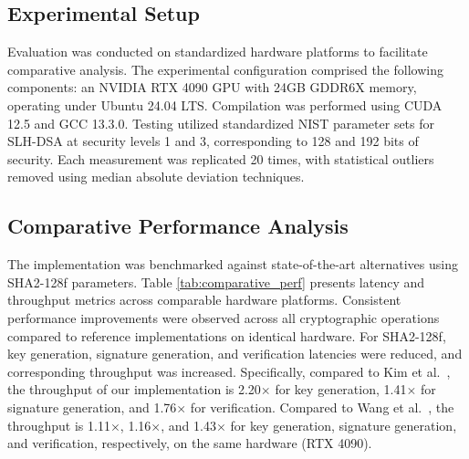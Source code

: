 \documentclass[journal]{IEEEtran}
\begin{document}
\subsection{Experimental Setup}

Evaluation was conducted on standardized hardware platforms to facilitate comparative analysis. The experimental configuration comprised the following components: an NVIDIA RTX 4090 GPU with 24GB GDDR6X memory, operating under Ubuntu 24.04 LTS. Compilation was performed using CUDA 12.5 and GCC 13.3.0.
Testing utilized standardized NIST parameter sets for SLH-DSA at security levels 1 and 3, corresponding to 128 and 192 bits of security. Each measurement was replicated 20 times, with statistical outliers removed using median absolute deviation techniques.

\subsection{Comparative Performance Analysis}

The implementation was benchmarked against state-of-the-art alternatives using SHA2-128f parameters. Table \ref{tab:comparative_perf} presents latency and throughput metrics across comparable hardware platforms.
Consistent performance improvements were observed across all cryptographic operations compared to reference implementations on identical hardware.
For SHA2-128f, key generation, signature generation, and verification latencies were reduced, and corresponding throughput was increased. Specifically, compared to Kim et al.~\cite{Kim2024}, the throughput of our implementation is 2.20$\times$ for key generation, 1.41$\times$ for signature generation, and 1.76$\times$ for verification. Compared to Wang et al.~\cite{Wang2025}, the throughput is 1.11$\times$, 1.16$\times$, and 1.43$\times$ for key generation, signature generation, and verification, respectively, on the same hardware (RTX 4090).
\end{document}
